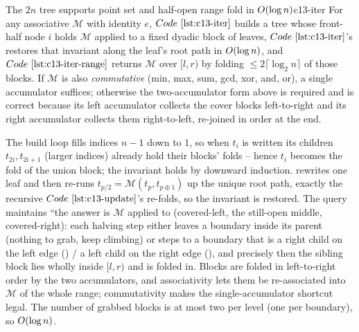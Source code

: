 \begin{proposition}{The \(2n\) tree supports point set and half-open range fold in \(O(\log n)\)}{c13-iter}
For any associative \(\mathcal{M}\) with identity \(e\), \(\coderef{c13-iter}\)
builds a tree whose front-half node \(i\) holds \(\mathcal{M}\) applied to a fixed
dyadic block of leaves, \(\coderef{c13-iter}\)'s  restores that
invariant along the leaf's root path in \(O(\log n)\), and
\(\coderef{c13-iter-range}\) returns \(\mathcal{M}\) over \([l,r)\) by folding
\(\le 2\lceil\log_2 n\rceil\) of those blocks.  If \(\mathcal{M}\) is also
\emph{commutative} (min, max, sum, gcd, xor, and, or), a single accumulator
suffices; otherwise the two-accumulator form above is required and is correct
because its left accumulator collects the cover blocks left-to-right and its
right accumulator collects them right-to-left, re-joined in order at the end.
\end{proposition}
\begin{proofbox}
The build loop fills indices \(n{-}1\) down to \(1\), so when \(t_i\) is written
its children \(t_{2i},t_{2i{+}1}\) (larger indices) already hold their blocks'
folds -- hence \(t_i\) becomes the fold of the union block; the invariant holds
by downward induction.   rewrites one leaf and then re-runs
\(t_{p/2}=\mathcal{M}(t_p,t_{p\oplus 1})\) up the unique root path, exactly the
recursive \(\coderef{c13-update}\)'s re-folds, so the invariant is restored.  The
query maintains ``the answer is \(\mathcal{M}\) applied to (covered-left, the
still-open middle, covered-right): each halving step either leaves a boundary inside
its parent (nothing to grab, keep climbing) or steps to a boundary that is a
right child on the left edge () / a left child on the right edge
(), and precisely then the sibling block lies wholly inside \([l,r)\)
and is folded in.  Blocks are folded in left-to-right order by the two
accumulators, and associativity lets them be re-associated into \(\mathcal{M}\)
of the whole range; commutativity makes the single-accumulator shortcut legal.
The number of grabbed blocks is at most two per level (one per boundary), so
\(O(\log n)\).
\end{proofbox}

